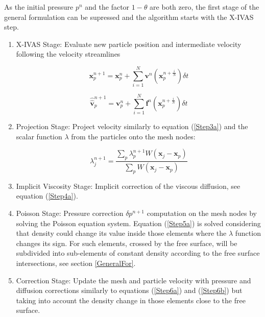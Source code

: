 As the initial pressure $p^n$ and the factor $1-\theta$ are both zero, the first stage of the general formulation can be supressed and the algorithm starts with the X-IVAS step. 

\begin{enumerate}

\item X-IVAS Stage: Evaluate new particle position and intermediate velocity following the velocity streamlines

 \begin{equation}\label{Step2astep2fluids}
\mathbf{x}^{n+1}_{p}=\mathbf{x}^{n}_{p} + \sum_{i=1}^{N} \mathbf{v}^{n}(\mathbf{x}^{n+\frac{i}{N}}_{p}) \delta t
\end{equation}

\begin{equation}\label{Step2bstep2fluids}
\widehat{\widehat{\mathbf{v}}}^{n+1}_{p}=\mathbf{v}^{n}_{p} + \sum_{i=1}^{N} \mathbf{f}^{n} (\mathbf{x}^{n+\frac{i}{N}}_{p})  \delta t
\end{equation}

\item Projection Stage: Project velocity similarly to equation (\ref{Step3a}) and the scalar function $\lambda$ from the particles onto the mesh nodes:

\begin{equation}\label{Step3b}
\displaystyle \lambda^{n+1}_{j}=\frac{\sum_{p} \lambda^{n+1}_{p} W(\mathbf{x}_{j}-\mathbf{x}_{p})}{\sum_{p} W(\mathbf{x}_{j}-\mathbf{x}_{p})}
\end{equation}

\item Implicit Viscosity Stage: Implicit correction of the viscous diffusion, see equation (\ref{Step4a}).

\item Poisson Stage: Pressure correction $\delta p^{n+1}$ computation on the mesh nodes by solving the Poisson equation system. Equation (\ref{Step5a}) is solved considering that density could change its value inside those elements where the $\lambda$ function changes its sign. For such elements, crossed by the free surface, will be subdivided into sub-elements of constant density according to the free surface intersections, see section \ref{GeneralFor}.
    
\item Correction Stage: Update the mesh and particle velocity with pressure and diffusion corrections similarly to equations (\ref{Step6a}) and (\ref{Step6b}) but taking into account the density change in those elements close to the free surface.

\end{enumerate}
